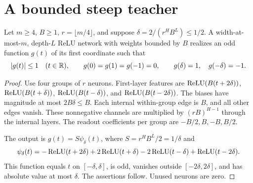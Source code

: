 \section{A bounded steep teacher}
\begin{lemma}
\label{lem:tent}
Let $m\ge4$, $B\ge1$, $r=\lfloor m/4\rfloor$, and suppose
$\delta=2/(r^HB^L)\le1/2$. A width-at-most-$m$, depth-$L$ ReLU network with weights bounded by $B$ realizes an odd function $g(t)$ of its first coordinate such that
\[
 |g(t)|\le1\quad(t\in\mathbb R),\qquad
 g(0)=g(1)=g(-1)=0,\qquad g(\delta)=1,\quad g(-\delta)=-1.
\]
\end{lemma}
\begin{proof}
Use four groups of $r$ neurons. First-layer features are
$\operatorname{ReLU}(B(t+2\delta))$, $\operatorname{ReLU}(B(t+\delta))$,
$\operatorname{ReLU}(B(t-\delta))$, and $\operatorname{ReLU}(B(t-2\delta))$.
The biases have magnitude at most $2B\delta\le B$. Each internal within-group edge is $B$, and all other edges vanish. These nonnegative channels are multiplied by $(rB)^{H-1}$ through the internal layers. The readout coefficients per group are $-B/2,B,-B,B/2$.

The output is $g(t)=S\psi_\delta(t)$, where $S=r^HB^L/2=1/\delta$ and
\[
 \psi_\delta(t)=-\operatorname{ReLU}(t+2\delta)+2\operatorname{ReLU}(t+\delta)
                 -2\operatorname{ReLU}(t-\delta)+\operatorname{ReLU}(t-2\delta).
\]
This function equals $t$ on $[-\delta,\delta]$, is odd, vanishes outside $[-2\delta,2\delta]$, and has absolute value at most $\delta$. The assertions follow. Unused neurons are zero.
\end{proof}

